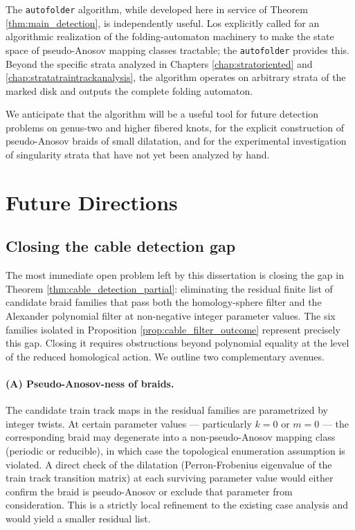 The \texttt{autofolder} algorithm, while developed here in service of Theorem \ref{thm:main_detection}, is independently useful. Los \cite{LosAlgorithm} explicitly called for an algorithmic realization of the folding-automaton machinery to make the state space of pseudo-Anosov mapping classes tractable; the \texttt{autofolder} provides this. Beyond the specific strata analyzed in Chapters \ref{chap:stratoriented} and \ref{chap:stratatraintrackanalysis}, the algorithm operates on arbitrary strata of the marked disk and outputs the complete folding automaton.

We anticipate that the algorithm will be a useful tool for future detection problems on genus-two and higher fibered knots, for the explicit construction of pseudo-Anosov braids of small dilatation, and for the experimental investigation of singularity strata that have not yet been analyzed by hand.

\section{Future Directions}\label{sec:future_directions}

\subsection{Closing the cable detection gap}
\label{sec:closing_cable_gap}

The most immediate open problem left by this dissertation is closing the gap in Theorem \ref{thm:cable_detection_partial}: eliminating the residual finite list of candidate braid families that pass both the homology-sphere filter and the Alexander polynomial filter at non-negative integer parameter values. The six families isolated in Proposition \ref{prop:cable_filter_outcome} represent precisely this gap. Closing it requires obstructions beyond polynomial equality at the level of the reduced homological action. We outline two complementary avenues.

\paragraph{(A) Pseudo-Anosov-ness of braids.}
The candidate train track maps in the residual families are parametrized by integer twists. At certain parameter values --- particularly $k = 0$ or $m = 0$ --- the corresponding braid may degenerate into a non-pseudo-Anosov mapping class (periodic or reducible), in which case the topological enumeration assumption is violated. A direct check of the dilatation (Perron-Frobenius eigenvalue of the train track transition matrix) at each surviving parameter value would either confirm the braid is pseudo-Anosov or exclude that parameter from consideration. This is a strictly local refinement to the existing case analysis and would yield a smaller residual list.

